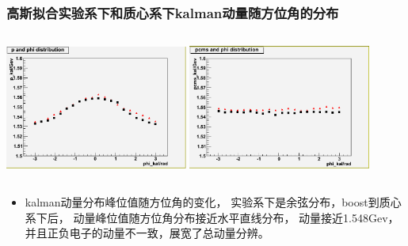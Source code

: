 \documentclass{beamer}
\begin{document}
\begin{frame}
    \frametitle{高斯拟合实验系下和质心系下kalman动量随方位角的分布}
    \begin{columns}
        \column{6.0cm}
        \includegraphics[width=6cm, keepaspectratio]{data/p_kal_phi_kal.png}
        \column{6.0cm}
        \includegraphics[width=6cm, keepaspectratio]{data/pcms_kal_phi_kal01.png}
    \end{columns}
    \begin{itemize}
        \item kalman动量分布峰位值随方位角的变化，
            实验系下是余弦分布，boost到质心系下后，
            动量峰位值随方位角分布接近水平直线分布，
            动量接近1.548Gev，并且正负电子的动量不一致，展宽了总动量分辨。
    \end{itemize}

\end{frame}
\end{document}
